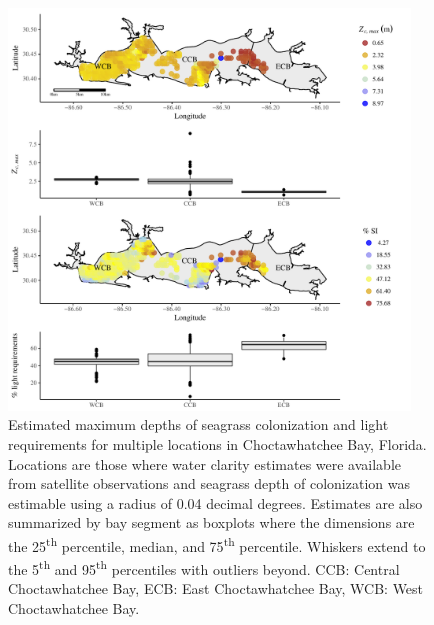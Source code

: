 \documentclass[letterpaper,12pt,oneside]{article}\usepackage[]{graphicx}\usepackage[]{color}
\begin{document}
\begin{figure}
\centering
\includegraphics[width = 0.95\textwidth]{figs/FigS2.pdf}
\caption{Estimated maximum depths of seagrass colonization and light requirements for multiple locations in Choctawhatchee Bay, Florida. Locations are those where water clarity estimates were available from satellite observations and seagrass depth of colonization was estimable using a radius of 0.04 decimal degrees.  Estimates are also summarized by bay segment as boxplots where the dimensions are the 25\textsuperscript{th} percentile, median, and 75\textsuperscript{th} percentile.  Whiskers extend to the 5\textsuperscript{th} and 95\textsuperscript{th} percentiles with outliers beyond. CCB: Central Choctawhatchee Bay, ECB: East Choctawhatchee Bay, WCB: West Choctawhatchee Bay.}
\label{fig:light_choc_zcmax}
\end{figure}

\end{document}
